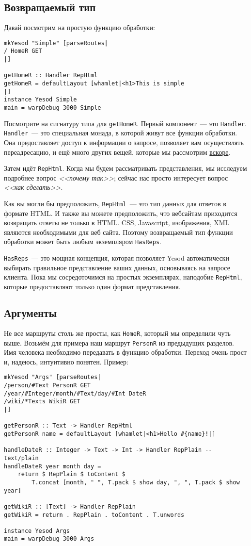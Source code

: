 \subsection{Возвращаемый тип}
Давай посмотрим на простую функцию обработки:
\begin{lstlisting}
mkYesod "Simple" [parseRoutes|
/ HomeR GET
|]

getHomeR :: Handler RepHtml
getHomeR = defaultLayout [whamlet|<h1>This is simple
|]
instance Yesod Simple
main = warpDebug 3000 Simple
\end{lstlisting}

Посмотрите на сигнатуру типа для \lstinline!getHomeR!. Первый
компонент~--- это \lstinline!Handler!. \lstinline!Handler!~--- это
специальная монада, в которой живут все функции обработки. Она
предоставляет доступ к информации о запросе, позволяет вам
осуществлять переадресацию, и ещё много других вещей, которые мы
рассмотрим \hyperref[sec:handler-monad]{вскоре}.

Затем идёт \lstinline!RepHtml!. Когда мы будем рассматривать
представления,
мы исследуем подробнее вопрос \emph{<<почему так>>}; сейчас
нас просто интересует вопрос \emph{<<как сделать>>}.

Как вы могли бы предположить, \lstinline!RepHtml!~--- это тип данных
для ответов в формате HTML. И также вы можете предположить, что вебсайтам
приходится возвращать ответы не только в HTML. CSS, Javascript,
изображения, XML являются необходимыми для веб сайта. Поэтому
возвращаемый тип функции обработки может быть любым экземпляром
\lstinline!HasReps!.

\lstinline!HasReps!~--- это мощная концепция, которая позволяет Yesod
автоматически выбирать правильное представление ваших данных,
основываясь на запросе клиента. Пока мы сосредоточимся на простых
экземплярах, наподобие \lstinline!RepHtml!, которые предоставляют
только один формат представления.

\subsection{Аргументы}
Не все маршруты столь же просты, как \lstinline!HomeR!, который мы
определили чуть выше. Возьмём для примера наш маршрут
\lstinline!PersonR! из предыдущих разделов. Имя человека необходимо
передавать в функцию обработки. Переход очень прост и, надеюсь,
интуитивно понятен. Пример:
\begin{lstlisting}
mkYesod "Args" [parseRoutes|
/person/#Text PersonR GET
/year/#Integer/month/#Text/day/#Int DateR
/wiki/*Texts WikiR GET
|]

getPersonR :: Text -> Handler RepHtml
getPersonR name = defaultLayout [whamlet|<h1>Hello #{name}!|]

handleDateR :: Integer -> Text -> Int -> Handler RepPlain -- text/plain
handleDateR year month day =
    return $ RepPlain $ toContent $
        T.concat [month, " ", T.pack $ show day, ", ", T.pack $ show year]

getWikiR :: [Text] -> Handler RepPlain
getWikiR = return . RepPlain . toContent . T.unwords

instance Yesod Args
main = warpDebug 3000 Args
\end{lstlisting}%

